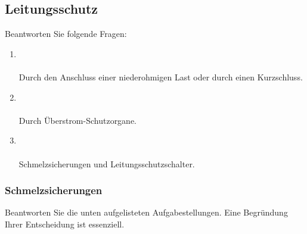 \subsection{Leitungsschutz}
Beantworten Sie folgende Fragen:

\begin{enumerate}
    \item   {} \\\\
            Durch den Anschluss einer niederohmigen Last oder durch einen Kurzschluss.
    \item   {} \\\\
            Durch Überstrom-Schutzorgane.
    \item   {} \\\\
            Schmelzsicherungen und Leitungsschutzschalter.
\end{enumerate}

\subsubsection{Schmelzsicherungen}
Beantworten Sie die unten aufgelisteten Aufgabestellungen. Eine Begründung Ihrer Entscheidung ist essenziell.

